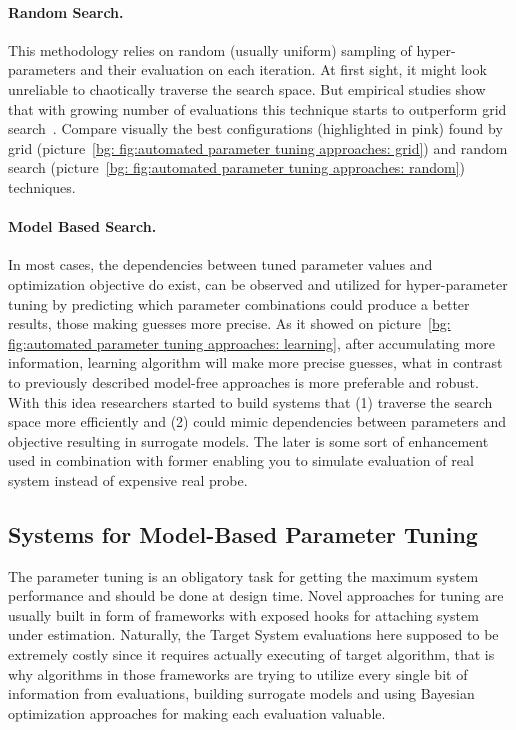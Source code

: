 \paragraph{Random Search.} This methodology relies on random (usually uniform) sampling of hyper-parameters and their evaluation on each iteration. At first sight, it might look unreliable to chaotically traverse the search space. But empirical studies show that with growing number of evaluations this technique starts to outperform grid search~\cite{bergstra2012random}. Compare visually the best configurations (highlighted in pink) found by grid (picture~\ref{bg: fig:automated parameter tuning approaches: grid}) and random search (picture~\ref{bg: fig:automated parameter tuning approaches: random}) techniques.

\paragraph{Model Based Search.} In most cases, the dependencies between tuned parameter values and optimization objective do exist, can be observed and utilized for hyper-parameter tuning by predicting which parameter combinations could produce a better results, those making guesses more precise. As it showed on picture~\ref{bg: fig:automated parameter tuning approaches: learning}, after accumulating more information, learning algorithm will make more precise guesses, what in contrast to previously described model-free approaches is more preferable and robust.
With this idea researchers started to build systems that (1) traverse the search space more efficiently and (2) could mimic dependencies between parameters and objective resulting in surrogate models. The later is some sort of enhancement used in combination with former enabling you to simulate evaluation of real system instead of expensive real probe.



\subsection{Systems for Model-Based Parameter Tuning}\label{bg: parameter tuning expamples}
The parameter tuning is an obligatory task for getting the maximum system performance and should be done at design time.
Novel approaches for tuning are usually built in form of frameworks with exposed hooks for attaching system under estimation.
Naturally, the Target System evaluations here supposed to be extremely costly since it requires actually executing of target algorithm, that is why algorithms in those frameworks are trying to utilize every single bit of information from evaluations, building surrogate models and using Bayesian optimization approaches for making each evaluation valuable.

